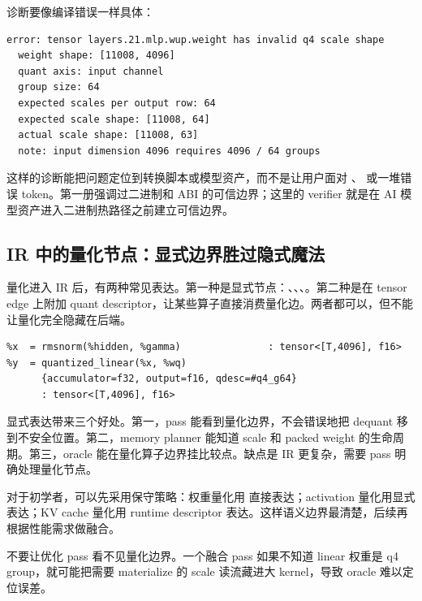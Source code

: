 诊断要像编译错误一样具体：

\begin{lstlisting}[numbers=none,caption={量化 verifier 诊断示例}]
error: tensor layers.21.mlp.wup.weight has invalid q4 scale shape
  weight shape: [11008, 4096]
  quant axis: input channel
  group size: 64
  expected scales per output row: 64
  expected scale shape: [11008, 64]
  actual scale shape: [11008, 63]
  note: input dimension 4096 requires 4096 / 64 groups
\end{lstlisting}

这样的诊断能把问题定位到转换脚本或模型资产，而不是让用户面对 、 或一堆错误 token。第一册强调过二进制和 ABI 的可信边界；这里的 verifier 就是在 AI 模型资产进入二进制热路径之前建立可信边界。

\subsection{IR 中的量化节点：显式边界胜过隐式魔法}

量化进入 IR 后，有两种常见表达。第一种是显式节点：、、、。第二种是在 tensor edge 上附加 quant descriptor，让某些算子直接消费量化边。两者都可以，但不能让量化完全隐藏在后端。

\begin{lstlisting}[numbers=none,caption={显式量化 IR 的形状}]
%wq = const_weight "layers.0.attn.wq.weight" : tensor<[4096,4096], q4_group>
%x  = rmsnorm(%hidden, %gamma)               : tensor<[T,4096], f16>
%y  = quantized_linear(%x, %wq)
      {accumulator=f32, output=f16, qdesc=#q4_g64}
      : tensor<[T,4096], f16>
\end{lstlisting}

显式表达带来三个好处。第一，pass 能看到量化边界，不会错误地把 dequant 移到不安全位置。第二，memory planner 能知道 scale 和 packed weight 的生命周期。第三，oracle 能在量化算子边界挂比较点。缺点是 IR 更复杂，需要 pass 明确处理量化节点。

对于初学者，可以先采用保守策略：权重量化用  直接表达；activation 量化用显式  表达；KV cache 量化用 runtime descriptor 表达。这样语义边界最清楚，后续再根据性能需求做融合。

\begin{warningbox}
不要让优化 pass 看不见量化边界。一个融合 pass 如果不知道 linear 权重是 q4 group，就可能把需要 materialize 的 scale 读流藏进大 kernel，导致 oracle 难以定位误差。
\end{warningbox}

